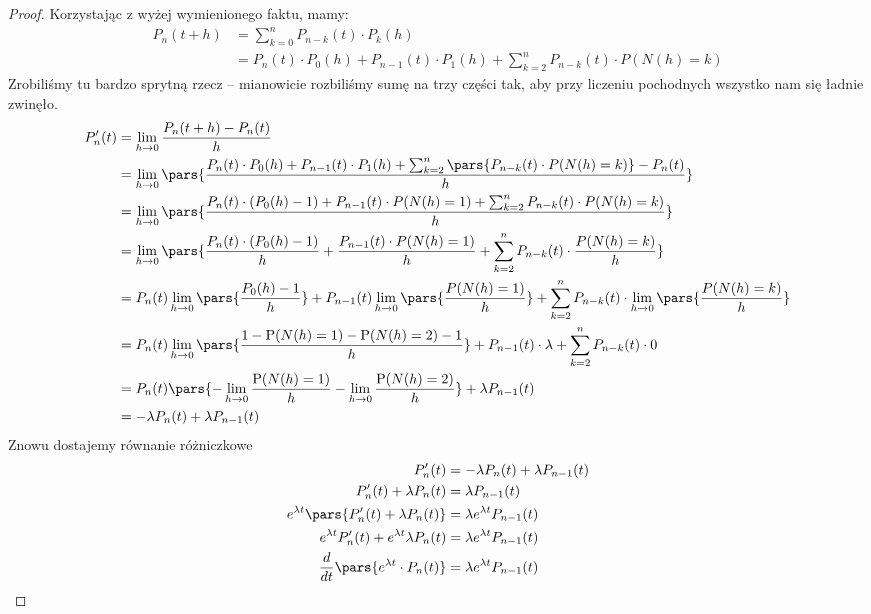 \begin{proof}
    Korzystając z wyżej wymienionego faktu, mamy: 
    \begin{align*}
        P_n(t + h)
            &= \sum_{k=0}^n P_{n-k}(t) \cdot P_k(h) \\
            &= P_n(t) \cdot P_0(h) + P_{n-1}(t) \cdot P_1(h) + \sum_{k=2}^n P_{n-k}(t) \cdot P(N(h) = k) 
    \end{align*}
    Zrobiliśmy tu bardzo sprytną rzecz -- mianowicie rozbiliśmy sumę na trzy części tak, aby przy liczeniu pochodnych wszystko nam się ładnie zwinęło.
    \begin{align*}
        P_n'(t) 
            &= \lim_{h \rightarrow 0} \frac{P_n(t + h) - P_n(t)}{h} \\
            &=  \lim_{h \rightarrow 0} \pars{ \frac{
                P_n(t) \cdot P_0(h) + P_{n-1}(t) \cdot P_1(h) + \sum_{k=2}^n \pars{P_{n-k}(t) \cdot P(N(h) = k)} - P_n(t)}{h}
                } \\
            &=  \lim_{h \rightarrow 0} \pars{ \frac{
                P_n(t) \cdot (P_0(h) - 1) + P_{n-1}(t) \cdot P(N(h)=1) + \sum_{k=2}^n P_{n-k}(t) \cdot P(N(h) = k)}{h}
                } \\
            &=  \lim_{h \rightarrow 0} \pars{
                \frac{P_n(t) \cdot (P_0(h) - 1)}{h} 
                + \frac{P_{n-1}(t)\cdot P(N(h) = 1)}{h}
                + \sum_{k=2}^n P_{n-k}(t) \cdot \frac{P(N(h) = k)}{h}} \\
            &= P_n(t) \lim_{h \rightarrow 0} \pars{\frac{P_0(h) - 1}{h}} + P_{n-1}(t) \lim_{h \rightarrow 0} \pars{\frac{P(N(h)=1)}{h}} + \sum_{k=2}^n P_{n-k}(t) \cdot \lim_{h \rightarrow 0} \pars{\frac{P(N(h) = k)}{h}} \\
            &= P_n(t) \lim_{h \rightarrow 0} \pars{\frac{1 - \mathrm{P}(N(h) = 1) - \mathrm{P}(N(h) = 2) - 1}{h}} + P_{n-1}(t) \cdot \lambda + \sum_{k=2}^n P_{n-k}(t) \cdot 0 \\
            &= P_n(t) \pars{-\lim_{h \rightarrow 0}\frac{\mathrm{P}(N(h)=1)}{h} - \lim_{h \rightarrow 0} \frac{\mathrm{P}(N(h)=2)}{h}} + \lambda P_{n-1}(t) \\
            &= -\lambda P_n(t) + \lambda P_{n-1}(t) 
    \end{align*}
    Znowu dostajemy równanie różniczkowe
    \begin{align*}
        P_n'(t) &= -\lambda P_n(t) + \lambda P_{n-1}(t) \\
        P_n'(t) + \lambda P_n(t) &= \lambda P_{n-1}(t) \\
        e^{\lambda t}\pars{P_n'(t) + \lambda P_n(t)} &= \lambda e^{\lambda t} P_{n-1}(t) \\
        e^{\lambda t} P'_{n}(t) + e^{\lambda t} \lambda P_n(t) &= \lambda e^{\lambda t} P_{n-1}(t) \\  
        \frac{d}{dt}\pars{e^{\lambda t}\cdot P_n(t)} &= \lambda e^{\lambda t} P_{n-1}(t)
    \end{align*}
    

\end{proof}
